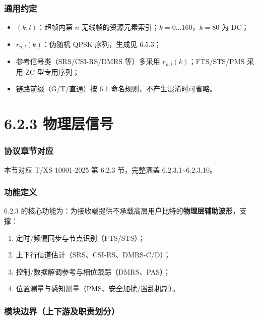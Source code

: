 \documentclass[11pt,a4paper]{ctexart}
\begin{document}
\section{通用约定}

\begin{itemize}[nosep]
  \item $(k,l)$：超帧内第 $n$ 无线帧的资源元素索引；$k=0\ldots 160$，$k=80$ 为 DC；
  \item $r_{n,l}(k)$：伪随机 QPSK 序列，生成见 6.5.3；
  \item 参考信号类（SRS/CSI-RS/DMRS 等）多采用 $r_{n,l}(k)$；FTS/STS/PMS 采用 ZC 型专用序列；
  \item 链路前缀（G/T/直通）按 6.1 命名规则，不产生混淆时可省略。
\end{itemize}

\newpage
\part{6.2.3 物理层信号}

\section{协议章节对应}

本节对应 T/XS 10001-2025 第 6.2.3 节，完整涵盖 6.2.3.1\textasciitilde 6.2.3.10。

\section{功能定义}

6.2.3 的核心功能为：为接收端提供不承载高层用户比特的\textbf{物理层辅助波形}，支撑：
\begin{enumerate}[nosep]
  \item 定时/频偏同步与节点识别（FTS/STS）；
  \item 上下行信道估计（SRS、CSI-RS、DMRS-C/D）；
  \item 控制/数据解调参考与相位跟踪（DMRS、PAS）；
  \item 位置测量与感知测量（PMS、安全加扰/置乱机制）。
\end{enumerate}

\section{模块边界（上下游及职责划分）}
\end{document}
